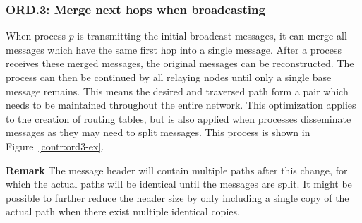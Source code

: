 \subsubsection{ORD.3: Merge next hops when broadcasting}
When process $p$ is transmitting the initial broadcast messages, it can merge all messages which have the same first hop into a single message. After a process receives these merged messages, the original messages can be reconstructed. The process can then be continued by all relaying nodes until only a single base message remains. This means the desired and traversed path form a pair which needs to be maintained throughout the entire network. This optimization applies to the creation of routing tables, but is also applied when processes disseminate messages as they may need to split messages. This process is shown in Figure~\ref{contr:ord3-ex}.

\textbf{Remark}
The message header will contain multiple paths after this change, for which the actual paths will be identical until the messages are split. It might be possible to further reduce the header size by only including a single copy of the actual path when there exist multiple identical copies.

